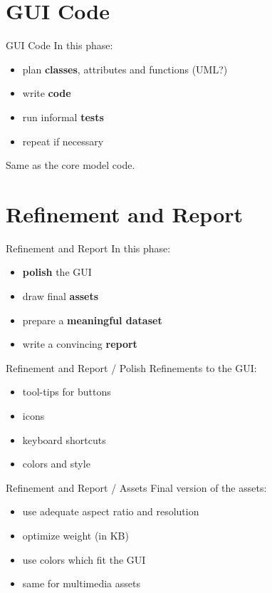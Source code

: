 \documentclass[11pt]{beamer}
\renewcommand{\emph}[1]{\textbf{#1}}
\begin{document}
\section{GUI Code}
\begin{frame}{GUI Code}
 In this phase:
 
 \begin{itemize}
  \item plan \emph{classes}, attributes and functions (UML?)
  \item write \emph{code}
  \item run informal \emph{tests}
  \item repeat if necessary
 \end{itemize}
 
 Same as the core model code.
\end{frame}


\section{Refinement and Report}
\begin{frame}{Refinement and Report}
 In this phase:
 
 \begin{itemize}
  \item \emph{polish} the GUI
  \item draw final \emph{assets}
  \item prepare a \emph{meaningful dataset}
  \item write a convincing \emph{report}
 \end{itemize}
\end{frame}


\begin{frame}{Refinement and Report / Polish}
 Refinements to the GUI:
 
 \begin{itemize}
  \item tool-tips for buttons
  \item icons
  \item keyboard shortcuts
  \item colors and style
 \end{itemize}
\end{frame}


\begin{frame}{Refinement and Report / Assets}
 Final version of the assets:
 
 \begin{itemize}
  \item use adequate aspect ratio and resolution
  \item optimize weight (in KB)
  \item use colors which fit the GUI
  \item same for multimedia assets
 \end{itemize}
\end{frame}
\end{document}
